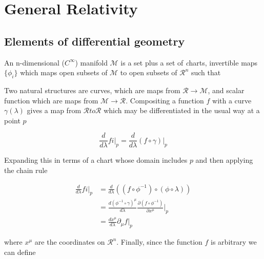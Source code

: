 
\section{General Relativity}
\subsection{Elements of differential geometry}

An n-dimensional ($C^\infty$) manifold $\mathcal{M}$ is a set plus a
set of {\emph charts}, invertible maps $\{\phi_i\}$ which maps open
subsets of $\mathcal{M}$ to open subsets of $\mathcal{R}^n$ such that

\iffalse
\begin{list}
\item For all points $p \in \mathcal{M}$ there exists an $\phi_i$ 
such that $p$ is in the domain of $\phi_i$.
\item The composition $\phi_i \circ \phi_j^{-1}$ on the 
intersections of the domains of $\phi_i$ and $\phi_j$ is a
($C^\infty$) function from $\mathcal{R}^n \to \mathcal{R}^n$.
\end{list} 
\fi

Two natural structures are curves, which are maps from
$\mathcal{R}\to\mathcal{M}$, and scalar function which are maps from
$\mathcal{M}\to\mathcal{R}$.  Compositing a function $f$ with a curve
$\gamma(\lambda)$ gives a map from $\mathcal{R} to \mathcal{R}$ which
may be differentiated in the usual way at a point $p$


\begin{equation*}
\frac{d}{d \lambda} fi \big|_p = 
  \frac{d}{d\lambda} (f \circ \gamma) \big|_p
\end{equation*}


Expanding this in terms of a chart whose domain includes $p$ and then
applying the chain rule
 
\begin{align*}
\frac{d}{d \lambda} fi \big|_p &= 
 \frac{d}{d\lambda} ( (f \circ \phi^{-1}) \circ (\phi \circ
\lambda) ) \\
&= \frac{d(\phi^{-1} \circ \gamma)^\mu}{d\lambda} 
\frac{\partial (f \circ \phi^{-1}) }{\partial x^\mu} \big|_p \\
&= \frac{dx^\mu}{d\lambda} \partial_\mu f \big|_p
\end{align*}

where $x^\mu$ are the coordinates on $\mathcal{R}^n$.  Finally, since
the function $f$ is arbitrary we can define

